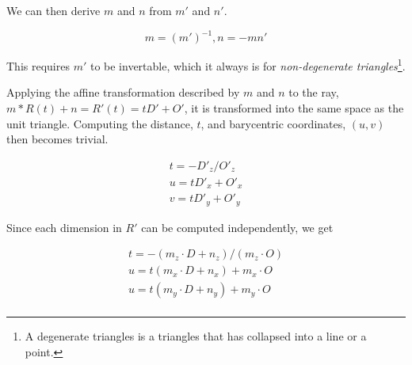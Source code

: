 We can then derive $m$ and $n$ from $m'$ and $n'$. 

\begin{displaymath}
  m = (m')^{-1},
  n = - m n'
\end{displaymath}

This requires $m'$ to be invertable, which it always is for
\textit{non-degenerate triangles}\footnote{A degenerate triangles is
  a triangles that has collapsed into a line or a point.}.



Applying the affine transformation described by $m$ and $n$ to the
ray, $m * R(t) + n = R'(t) = tD' + O'$, it is transformed into the
same space as the unit triangle. Computing the distance, $t$, and
barycentric coordinates, $(u,v)$ then becomes trivial.

\begin{displaymath}
  \begin{array}{l}
    t = - D'_z / O'_z \\
    u = t D'_x + O'_x \\
    v = t D'_y + O'_y
  \end{array}
\end{displaymath}

Since each dimension in $R'$ can be computed independently, we get 

\begin{displaymath}
  \begin{array}{l}
    t = - (m_z \cdot D + n_z) / (m_z \cdot O) \\
    u = t (m_x \cdot D + n_x) + m_x \cdot O \\
    u = t (m_y \cdot D + n_y) + m_y \cdot O \\
  \end{array}
\end{displaymath}

